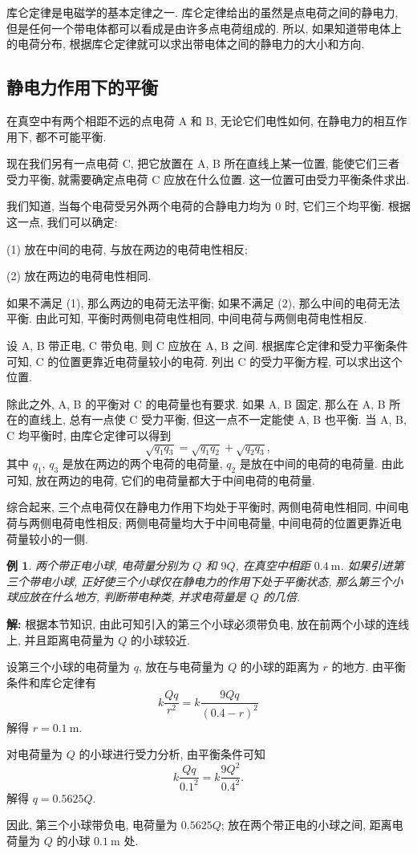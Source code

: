 \documentclass[UTF8,openany,fontset=fandol]{ctexbook}
\theoremstyle{chinesetextbook}
\newtheorem{example}{例}[chapter]
\newenvironment{solution}{\par\indent\textbf{解:} \ignorespaces}{\par}
\newcommand{\unit}[1]{\ \mathrm{#1}}
\begin{document}
库仑定律是电磁学的基本定律之一. 库仑定律给出的虽然是点电荷之间的静电力, 但是任何一个带电体都可以看成是由许多点电荷组成的. 所以, 如果知道带电体上的电荷分布, 根据库仑定律就可以求出带电体之间的静电力的大小和方向.
\subsection{静电力作用下的平衡}
在真空中有两个相距不远的点电荷 A 和 B, 无论它们电性如何, 在静电力的相互作用下, 都不可能平衡.

现在我们另有一点电荷 C, 把它放置在 A, B 所在直线上某一位置, 能使它们三者受力平衡, 就需要确定点电荷 C 应放在什么位置. 这一位置可由受力平衡条件求出.

我们知道, 当每个电荷受另外两个电荷的合静电力均为 0 时, 它们三个均平衡. 根据这一点, 我们可以确定:

(1) 放在中间的电荷, 与放在两边的电荷电性相反;

(2) 放在两边的电荷电性相同.

如果不满足 (1), 那么两边的电荷无法平衡; 如果不满足 (2), 那么中间的电荷无法平衡. 由此可知, 平衡时两侧电荷电性相同, 中间电荷与两侧电荷电性相反.

设 A, B 带正电, C 带负电, 则 C 应放在 A, B 之间. 根据库仑定律和受力平衡条件可知, C 的位置更靠近电荷量较小的电荷. 列出 C 的受力平衡方程, 可以求出这个位置.

除此之外, A, B 的平衡对 C 的电荷量也有要求. 如果 A, B 固定, 那么在 A, B 所在的直线上, 总有一点使 C 受力平衡, 但这一点不一定能使 A, B 也平衡. 当 A, B, C 均平衡时, 由库仑定律可以得到
\[
\sqrt{q_1q_3}=\sqrt{q_1q_2}+\sqrt{q_2q_3},
\]
其中 $q_1$, $q_3$ 是放在两边的两个电荷的电荷量, $q_2$ 是放在中间的电荷的电荷量. 由此可知, 放在两边的电荷, 它们的电荷量都大于中间电荷的电荷量.

综合起来, 三个点电荷仅在静电力作用下均处于平衡时, 两侧电荷电性相同, 中间电荷与两侧电荷电性相反; 两侧电荷量均大于中间电荷量, 中间电荷的位置更靠近电荷量较小的一侧.
\begin{example}
两个带正电小球, 电荷量分别为 $Q$ 和 $9Q$, 在真空中相距 $0.4\unit{m}$. 如果引进第三个带电小球, 正好使三个小球仅在静电力的作用下处于平衡状态, 那么第三个小球应放在什么地方, 判断带电种类, 并求电荷量是 $Q$ 的几倍.
\end{example}
\begin{solution}
根据本节知识, 由此可知引入的第三个小球必须带负电, 放在前两个小球的连线上, 并且距离电荷量为 $Q$ 的小球较近.

设第三个小球的电荷量为 $q$, 放在与电荷量为 $Q$ 的小球的距离为 $r$ 的地方. 由平衡条件和库仑定律有
\[
k\frac{Qq}{r^2}=k\frac{9Qq}{(0.4-r)^2}
\]
解得 $r=0.1\unit{m}.$

对电荷量为 $Q$ 的小球进行受力分析, 由平衡条件可知
\[
k\frac{Qq}{0.1^2}=k\frac{9Q^2}{0.4^2}.
\]
解得 $q=0.5625Q.$

因此, 第三个小球带负电, 电荷量为 $0.5625Q$; 放在两个带正电的小球之间, 距离电荷量为 $Q$ 的小球 $0.1\unit{m}$ 处.
\end{solution}
\end{document}
